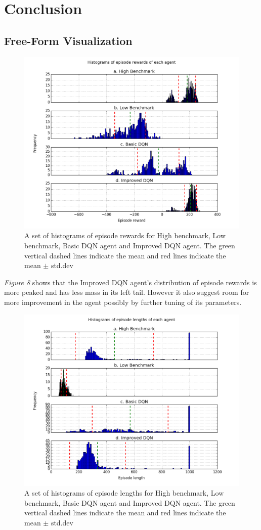 \documentclass{article}
\begin{document}
\section{Conclusion}
\subsection*{Free-Form Visualization}
\begin{figure}[H]
	\caption{A set of histograms of episode rewards for High benchmark, Low benchmark, Basic DQN agent and Improved DQN agent. The green vertical dashed lines indicate the mean and red lines indicate the mean $\pm$ std.dev}
	\centering
	\includegraphics[width=13cm,trim={0 0 0 0},clip]{img/ffviz_er}
\end{figure}
\textit{Figure 8} shows that the Improved DQN agent's distribution of episode rewards is more peaked and has less mass in its left tail. However it also suggest room for more improvement in the agent possibly by further tuning of its parameters.
\begin{figure}[H]
	\caption{A set of histograms of episode lengths for High benchmark, Low benchmark, Basic DQN agent and Improved DQN agent. The green vertical dashed lines indicate the mean and red lines indicate the mean $\pm$ std.dev}
	\centering
	\includegraphics[width=13cm,trim={0 0 0 0},clip]{img/ffviz_en}
\end{figure}
\end{document}
